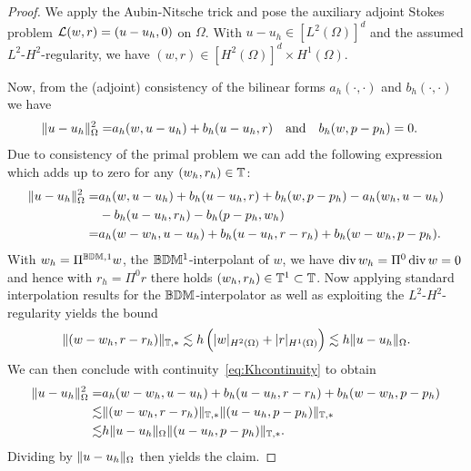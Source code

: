 \documentclass[pdflatex,sn-mathphys,Numbered]{sn-jnl}%
\theoremstyle{remark}%
\theoremstyle{definition}%
\begin{document}
  \begin{proof}
    We apply the Aubin-Nitsche trick and pose the auxiliary adjoint Stokes problem $\mathcal{L}(w,r) =
    (u-u_h,0)$ on $\Omega$. With $u-u_h \in [L^2(\Omega)]^d$ and the assumed
    $L^2$-$H^2$-regularity, we have $(w,r) \in [H^2(\Omega)]^d \times H^1(\Omega)$.

    Now, from the (adjoint) consistency of the bilinear forms
    $a_h(\cdot,\cdot)$ and $b_h(\cdot,\cdot)$ we have
    \begin{align*}
      \Vert u-u_h \Vert_{\Omega}^2
      =&a_h(w,u-u_h) + b_h(u-u_h,r) \quad\text{and}\quad b_h(w,p-p_h) = 0.
    \end{align*}      
    Due to consistency of the primal problem we can add the following
    expression which adds up to zero for any $(w_h,r_h) \in \mathbb{T}$:
    \begin{align*}
      \nrm{u-u_h}_{\Omega}^2 =&a_h(w,u-u_h) + b_h(u-u_h,r) + b_h(w, p-p_h) 
       - a_h(w_h,u-u_h) \\ & -b_h(u-u_h,r_h) - b_h(p-p_h,w_h) 
        \\ %
         =&a_h(w-w_h,u-u_h) + b_h(u-u_h,r-r_h) + b_h(w-w_h, p-p_h). %
    \end{align*}
    With $w_h = \Pi^{\mathbb{B}\mathbb{D}\mathbb{M},1} w$, the $\mathbb{B}\mathbb{D}\mathbb{M}^1$-interpolant of $w$, we have
    $\operatorname{\mathrm{div}} w_h = \Pi^0 \operatorname{\mathrm{div}} w = 0$ and hence with $r_h = \Pi^0 r$ there holds
    $(w_h,r_h) \in \mathbb{T}^1 \subset \mathbb{T}$. 
    Now applying
    standard interpolation results for the $\mathbb{B}\mathbb{D}\mathbb{M}$-interpolator as well as exploiting the $L^2$-$H^2$-regularity yields the bound 
    $$ \Vert  (w-w_h,r-r_h)  \Vert_{\mathbb{T},\ast} \lesssim h \left( \vert w \vert_{H^2(\Omega)} +
      \vert r \vert_{H^1(\Omega)} \right) \lesssim h \Vert u-u_h \Vert_{\Omega}.$$
    We can then conclude with continuity~\eqref{eq:Khcontinuity} to obtain
    \begin{align*}
      \Vert u-u_h \Vert_{\Omega}^2
      =&a_h(w-w_h,u-u_h) + b_h(u-u_h,r-r_h) + b_h(w-w_h, p-p_h) \\
      \lesssim&  \Vert  (w-w_h,r-r_h)  \Vert_{\mathbb{T},\ast} \Vert  (u-u_h,p-p_h)  \Vert_{\mathbb{T},\ast}
      \\
      \lesssim&  h \Vert u-u_h \Vert_{\Omega} \Vert  (u-u_h,p-p_h)  \Vert_{\mathbb{T},\ast}.
    \end{align*}
    Dividing by $\Vert u-u_h \Vert_{\Omega}$ then yields the claim.
    \end{proof}
\end{document}
